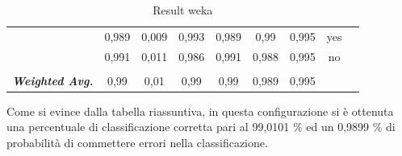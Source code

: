 \begin{table}[htbp]
{\begin{tabular}{rrrrrrrrr}
		\multicolumn{1}{c}{} & \multicolumn{1}{c}{0,989} & \multicolumn{1}{c}{0,009} & \multicolumn{1}{c}{0,993} & \multicolumn{1}{c}{0,989} & \multicolumn{1}{c}{0,99} & \multicolumn{1}{c}{0,995} & \multicolumn{1}{c}{yes} &  \\
		\multicolumn{1}{c}{} & \multicolumn{1}{c}{0,991} & \multicolumn{1}{c}{0,011} & \multicolumn{1}{c}{0,986} & \multicolumn{1}{c}{0,991} & \multicolumn{1}{c}{0,988} & \multicolumn{1}{c}{0,995} & \multicolumn{1}{c}{no} &  \\
		\multicolumn{1}{c}{} & \multicolumn{1}{c}{} & \multicolumn{1}{c}{} & \multicolumn{1}{c}{} & \multicolumn{1}{c}{} & \multicolumn{1}{c}{} & \multicolumn{1}{c}{} & \multicolumn{1}{c}{} &  \\
		\multicolumn{1}{c}{\textit{\textbf{Weighted Avg.}}} & \multicolumn{1}{c}{0,99} & \multicolumn{1}{c}{0,01} & \multicolumn{1}{c}{0,99} & \multicolumn{1}{c}{0,99} & \multicolumn{1}{c}{0,989} & \multicolumn{1}{c}{0,995} & \multicolumn{1}{c}{} &  \\
		\end{tabular}%
	}
		\label{tab:FTExtendFiltered}%
		\caption{Result weka}
		\end{table}%

Come si evince dalla tabella riassuntiva, in questa configurazione si è ottenuta una percentuale di classificazione corretta pari al 99,0101 \% ed un 0,9899 \% di probabilità di commettere errori nella classificazione.